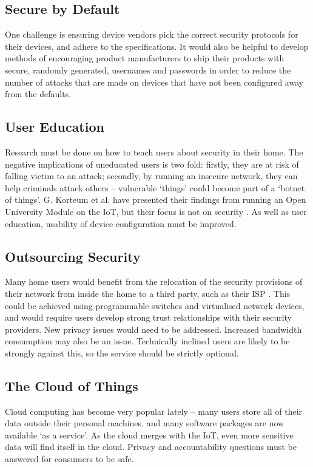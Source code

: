 \documentclass[10pt,journal,compsoc]{IEEEtran}
\begin{document}
\subsection{Secure by Default}
One challenge is ensuring device vendors pick the correct security protocols
for their devices, and adhere to the specifications. It would also be helpful
to develop methods of encouraging product manufacturers to ship their products
with secure, randomly generated, usernames and passwords in order to reduce the
number of attacks that are made on devices that have not been configured away
from the defaults.

\subsection{User Education}
Research must be done on how to teach users about security in their home. The
negative implications of uneducated users is two fold: firstly, they are at
risk of falling victim to an attack; secondly, by running an insecure network,
they can help criminals attack others -- vulnerable `things' could become part
of a `botnet of things'. G. Korteum et al. have presented their findings from
running an Open University Module on the IoT, but their focus is not on
security \cite{Kortuem2013}. As well as user education, usability of device
configuration must be improved. 

\subsection{Outsourcing Security}
Many home users would benefit from the relocation of the security provisions of
their network from inside the home to a third party, such as their ISP
\cite{Kritzinger2013}. This could be achieved using programmable switches and
virtualised network devices, and would require users develop strong trust
relationships with their security providers. New privacy issues would need to
be addressed. Increased bandwidth consumption may also be an issue. Technically
inclined users are likely to be strongly against this, so the service should
be strictly optional.

\subsection{The Cloud of Things}
Cloud computing has become very popular lately -- many users store all of their
data outside their personal machines, and many software packages are now
available `as a service'. As the cloud merges with the IoT, even more sensitive
data will find itself in the cloud. Privacy and accountability questions must
be answered for consumers to be safe.
\end{document}
